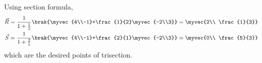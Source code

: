 Using section formula,
\begin{align}
\vec{R}=\frac{1}{1+\frac{1}{2}}\brak{\myvec{4\\-1}+\frac{1}{2}\myvec{-2\\3}}
=\myvec{2\\ \frac{1}{3}}\\
\vec{S}=\frac{1}{1+\frac{2}{1}}\brak{\myvec{4\\-1}+\frac{2}{1}\myvec{-2\\3}}
=\myvec{0\\ \frac{5}{3}}
\end{align}
which are the desired points of trisection.
\iffalse
See
		\figref{fig:chapters/10/7/2/2/Figure}
\begin{figure}[H]
\centering
\texttt{[image: chapters/10/7/2/2/figs/dj.pdf]}
\caption{}
		\label{fig:chapters/10/7/2/2/Figure}
\end{figure}
\fi
